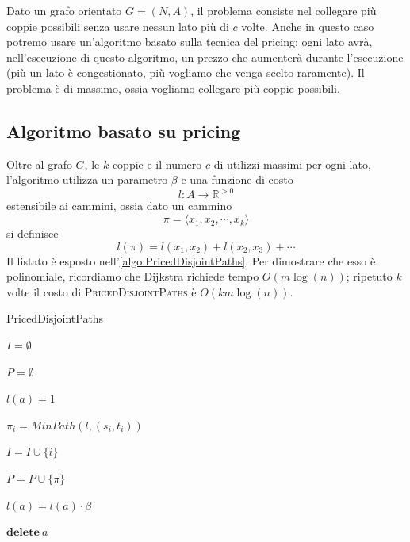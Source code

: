 Dato un grafo orientato $G=(N,A)$, il problema consiste nel collegare più
coppie possibili senza usare nessun lato più di $c$ volte.
Anche in questo caso potremo usare un'algoritmo basato sulla tecnica
del pricing: ogni lato avrà, nell'esecuzione di questo algoritmo,
un prezzo che aumenterà durante l'esecuzione (più un lato è congestionato,
più vogliamo che venga scelto raramente).
Il problema è di massimo, ossia vogliamo collegare più coppie possibili.

\subsection{Algoritmo basato su pricing}
Oltre al grafo $G$, le $k$ coppie e il numero $c$ di utilizzi massimi per ogni lato,
l'algoritmo utilizza un parametro $\beta$ e una funzione di costo
$$
	l: A \rightarrow \mathbb{R}^{>0}
$$
estensibile ai cammini, ossia dato un cammino
$$
	\pi = \langle x_1, x_2, \cdots, x_k \rangle
$$
si definisce
$$
	l(\pi) = l(x_1, x_2) + l(x_2, x_3) + \cdots
$$
Il listato è esposto nell'\cref{algo:PricedDisjointPaths}.
Per dimostrare che esso è polinomiale, ricordiamo che Dijkstra richiede
tempo $O(m \log(n))$; ripetuto $k$ volte il costo di \textsc{PricedDisjointPaths}
è $O(k m \log (n))$.

\begin{algorithm}
	\caption{PricedDisjointPaths}
	\label{algo:PricedDisjointPaths}

	$I = \emptyset$ 

	$P = \emptyset$ 

	{
		$l(a) = 1$
	}
	{


		$ \pi_i = MinPath(l, (s_i, t_i) )$
		{


		}

		$I = I \cup \{i\}$

		$P = P \cup \{\pi\}$


		{

			$l(a) = l(a) \cdot \beta $


			{
				$\mathbf{delete} ~ a$
			}
		}
	}

\end{algorithm}

